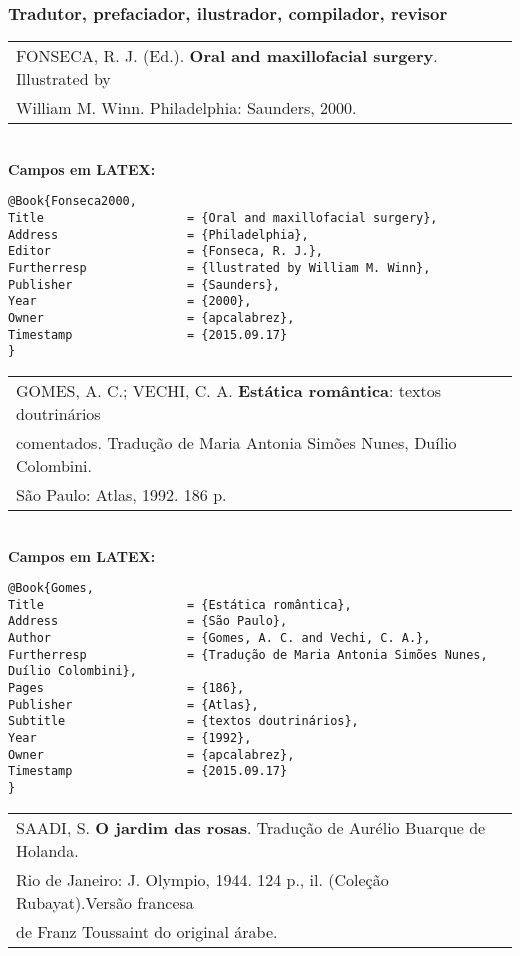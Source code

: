 \subsubsection{Tradutor, prefaciador, ilustrador, compilador, revisor}

\begin{tabular}{|l|c|} \hline
FONSECA, R. J. (Ed.). \textbf{Oral and maxillofacial surgery}. Illustrated by\\
William M. Winn. Philadelphia: Saunders, 2000. \\\hline
\end{tabular}\\

\textbf{Campos em LATEX:}

\begin{verbatim}
@Book{Fonseca2000,
Title                    = {Oral and maxillofacial surgery},
Address                  = {Philadelphia},
Editor                   = {Fonseca, R. J.},
Furtherresp              = {llustrated by William M. Winn},
Publisher                = {Saunders},
Year                     = {2000},
Owner                    = {apcalabrez},
Timestamp                = {2015.09.17}
}
\end{verbatim}

\begin{tabular}{|l|c|} \hline
GOMES, A. C.; VECHI, C. A. \textbf{Estática romântica}: textos doutrinários
\\ comentados. Tradução de Maria Antonia Simões Nunes, Duílio Colombini.
\\São Paulo: Atlas, 1992. 186 p.  \\\hline
\end{tabular}\\

\textbf{Campos em LATEX:}

\begin{verbatim}
@Book{Gomes,
Title                    = {Estática romântica},
Address                  = {São Paulo},
Author                   = {Gomes, A. C. and Vechi, C. A.},
Furtherresp              = {Tradução de Maria Antonia Simões Nunes, 
Duílio Colombini},
Pages                    = {186},
Publisher                = {Atlas},
Subtitle                 = {textos doutrinários},
Year                     = {1992},
Owner                    = {apcalabrez},
Timestamp                = {2015.09.17}
}
\end{verbatim}

\begin{tabular}{|l|c|} \hline
SAADI, S. \textbf{O jardim das rosas}. Tradução de Aurélio Buarque de Holanda.\\ Rio de Janeiro: J. Olympio, 1944. 124 p., il. (Coleção Rubayat).Versão francesa\\ de Franz Toussaint do original árabe.  \\\hline
\end{tabular}\\

